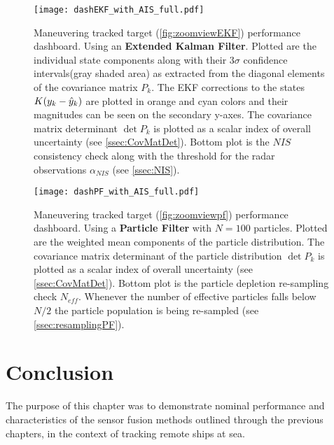 \begin{figure}
	\centering
	\texttt{[image: dashEKF\_with\_AIS\_full.pdf]}
	\caption{Maneuvering tracked target (\cref{fig:zoomviewEKF}) performance dashboard. Using an \textbf{Extended Kalman Filter}. Plotted are the individual state components along with their $3\sigma$ confidence intervals(gray shaded area) as extracted from the diagonal elements of the covariance matrix $P_k$. The EKF corrections to the states $K({{y}}_k - {\hat{{y}}}_k)$ are plotted in orange and cyan colors and their magnitudes can be seen on the secondary y-axes. The covariance matrix determinant $\det{P_k}$ is plotted as a scalar index of overall uncertainty (see \cref{ssec:CovMatDet}). Bottom plot is the $NIS$ consistency check along with the threshold for the radar observations $\alpha_{NIS}$ (see \cref{ssec:NIS}).}
	\label{fig:dashEKF_with_AIS_full}
\end{figure}

\begin{figure}
	\centering
	\texttt{[image: dashPF\_with\_AIS\_full.pdf]}
	\caption{Maneuvering tracked target (\cref{fig:zoomviewpf}) performance dashboard. Using a \textbf{Particle Filter} with $N=100$ particles. Plotted are the weighted mean components of the particle distribution. The covariance matrix determinant of the particle distribution $\det{P_k}$ is plotted as a scalar index of overall uncertainty (see \cref{ssec:CovMatDet}). Bottom plot is the particle depletion re-sampling check $N_{eff}$. Whenever the number of effective particles falls below $N/2$ the particle population is being re-sampled (see \cref{ssec:resamplingPF}).}
	\label{fig:dashPF_with_AIS_full}
\end{figure}

\section{Conclusion}

The purpose of this chapter was to demonstrate nominal performance and characteristics of the sensor fusion methods outlined through the previous chapters, in the context of tracking remote ships at sea. 

